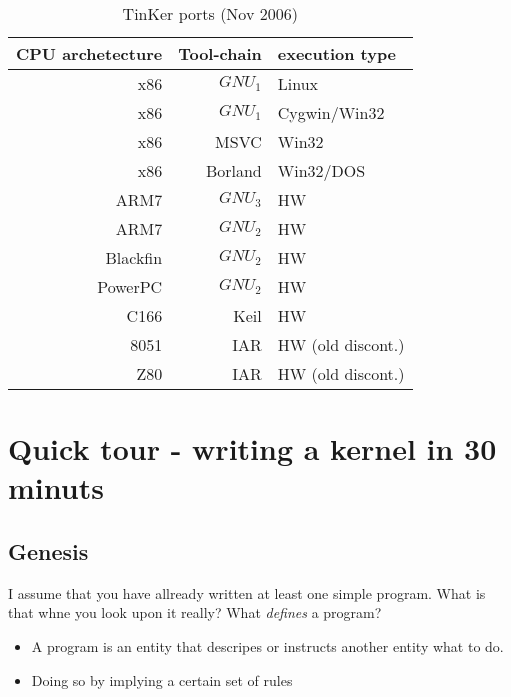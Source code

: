\begin{table}[!hbp]
\begin{tabular}{|r|rl|}
\hline
CPU archetecture 	& Tool-chain 	& execution type\\ \hline
x86 			& $GNU_1$	& Linux \\
x86 			& $GNU_1$	& Cygwin/Win32 \\
x86 			& MSVC		& Win32 \\
x86 			& Borland	& Win32/DOS \\
ARM7			& $GNU_3$	& HW\\
ARM7			& $GNU_2$	& HW\\
Blackfin		& $GNU_2$	& HW\\
PowerPC 		& $GNU_2$	& HW\\
C166 			& Keil		& HW\\
8051 			& IAR 		& HW (old discont.)\\
Z80 			& IAR 		& HW (old discont.)\\ \hline
\end{tabular}

\caption{TinKer ports (Nov 2006)}\label{ports}
\end{table}




\chapter{Quick tour - writing a kernel in 30 minuts}
\section{Genesis}
\label{kernel30}
I assume that you have allready written at least one simple program. What is that whne you look upon it really? What \textit{defines} a program?

\begin{itemize}
\item A program is an entity that descripes or instructs another entity what to do.
\item Doing so by implying a certain set of rules
\end{itemize}

